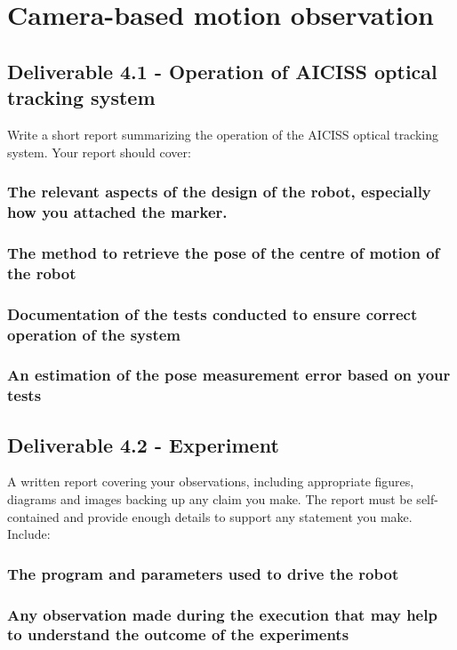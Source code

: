 \chapter{Camera-based motion observation}
\section{Deliverable 4.1 - Operation of AICISS optical tracking system}
Write a short report summarizing the operation of the AICISS optical tracking system. Your report should cover:
\subsection{The relevant aspects of the design of the robot, especially how you attached the marker.}

\subsection{The method to retrieve the pose of the centre of motion of the robot}

\subsection{Documentation of the tests conducted to ensure correct operation of the system}

\subsection{An estimation of the pose measurement error based on your tests}

\section{Deliverable 4.2 - Experiment}
A written report covering your observations, including appropriate figures, diagrams and images backing up any claim you make. The report must be self-contained and provide enough details to support any statement you make. Include:
\subsection{The program and parameters used to drive the robot}

\subsection{Any observation made during the execution that may help to understand the outcome of the experiments}

